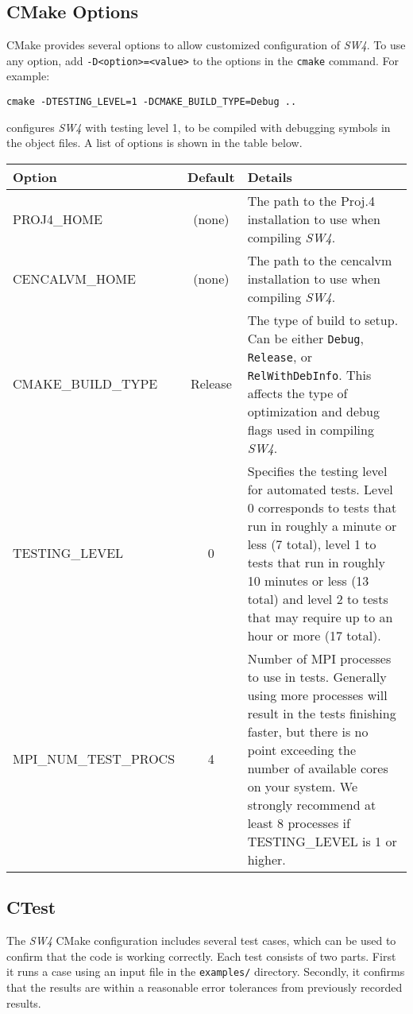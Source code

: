 \documentclass[11pt]{article}
\begin{document}
\subsection{CMake Options}
CMake provides several options to allow customized configuration of \emph{SW4}.  To use any option,
add \texttt{-D\textless option\textgreater=\textless value\textgreater} to the options in the
\texttt{cmake} command.  For example:
%
\begin{verbatim}
cmake -DTESTING_LEVEL=1 -DCMAKE_BUILD_TYPE=Debug ..
\end{verbatim}
%
configures \emph{SW4} with testing level 1, to be compiled with debugging symbols in the object
files. A list of options is shown in the table below.
%
\begin{center}
\begin{tabular}{|l|c|p{}|}
\hline
Option & Default & Details \\
\hline
%
PROJ4\_HOME & (none) & The path to the Proj.4 installation to use when compiling
\emph{SW4}. \\ \hline
%
CENCALVM\_HOME & (none) & The path to the cencalvm installation to use when compiling
\emph{SW4}. \\ \hline
%
CMAKE\_BUILD\_TYPE & Release & The type of build to setup. Can be either \texttt{Debug},
\texttt{Release}, or \texttt{RelWithDebInfo}.  This affects the type of optimization and debug flags
used in compiling \emph{SW4}. \\ \hline
%
TESTING\_LEVEL & 0 & Specifies the testing level for automated tests.  Level 0 corresponds to tests
that run in roughly a minute or less (7 total), level 1 to tests that run in roughly 10 minutes or
less (13 total) and level 2 to tests that may require up to an hour or more (17 total). \\ \hline
%
MPI\_NUM\_TEST\_PROCS & 4 & Number of MPI processes to use in tests. Generally using more processes
will result in the tests finishing faster, but there is no point exceeding the number of available
cores on your system.  We strongly recommend at least 8 processes if TESTING\_LEVEL is 1 or
higher.\\ \hline
%
\end{tabular}
\end{center}

\subsection{CTest}
The \emph{SW4} CMake configuration includes several test cases, which can be used to confirm that
the code is working correctly.  Each test consists of two parts. First it runs a case using an input
file in the \verb+examples/+ directory. Secondly, it confirms that the results are within
a reasonable error tolerances from previously recorded results.
\end{document}
